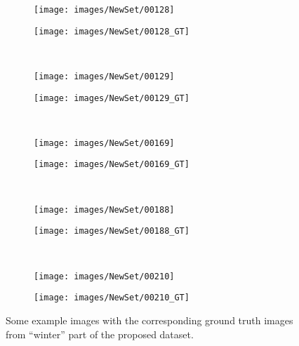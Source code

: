 \begin{figure}[t]
 \centering
 \begin{subfigure}[c]{0.4\textwidth}
  \centering
  \texttt{[image: images/NewSet/00128]}
 \end{subfigure}
 \begin{subfigure}[c]{0.4\textwidth}
  \centering
  \texttt{[image: images/NewSet/00128\_GT]}
 \end{subfigure}
 \\
 \begin{subfigure}[c]{0.4\textwidth}
  \centering
  \texttt{[image: images/NewSet/00129]}
 \end{subfigure}
 \begin{subfigure}[c]{0.4\textwidth}
  \centering
  \texttt{[image: images/NewSet/00129\_GT]}
 \end{subfigure}
 \\
 \begin{subfigure}[c]{0.4\textwidth}
  \centering
  \texttt{[image: images/NewSet/00169]}
 \end{subfigure}
 \begin{subfigure}[c]{0.4\textwidth}
  \centering
  \texttt{[image: images/NewSet/00169\_GT]}
 \end{subfigure}
 \\
 \begin{subfigure}[c]{0.4\textwidth}
  \centering
  \texttt{[image: images/NewSet/00188]}
 \end{subfigure}
 \begin{subfigure}[c]{0.4\textwidth}
  \centering
  \texttt{[image: images/NewSet/00188\_GT]}
 \end{subfigure}
 \\
 \begin{subfigure}[c]{0.4\textwidth}
  \centering
  \texttt{[image: images/NewSet/00210]}
 \end{subfigure}
 \begin{subfigure}[c]{0.4\textwidth}
  \centering
  \texttt{[image: images/NewSet/00210\_GT]}
 \end{subfigure}
 \caption{Some example images with the corresponding ground truth images from ``winter'' part of the
 proposed dataset.}\label{fig:winter_examples}
\end{figure}
